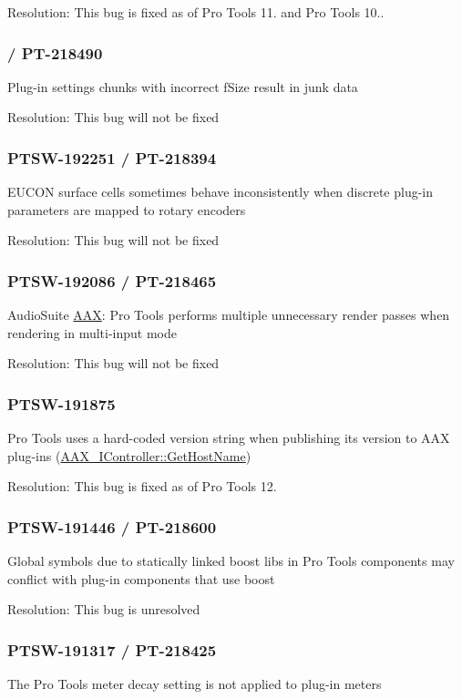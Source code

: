 Resolution\+: This bug is fixed as of Pro Tools 11. and Pro Tools 10..\hypertarget{a00374_PTSW-192456}{}\subsubsection{/ P\+T-\/218490}\label{a00374_PTSW-192456}
Plug-\/in settings chunks with incorrect f\+Size result in junk data

Resolution\+: This bug will not be fixed\hypertarget{a00374_PTSW-192251}{}\subsubsection{P\+T\+S\+W-\/192251 / P\+T-\/218394}\label{a00374_PTSW-192251}
E\+U\+C\+O\+N surface cells sometimes behave inconsistently when discrete plug-\/in parameters are mapped to rotary encoders

Resolution\+: This bug will not be fixed\hypertarget{a00374_PTSW-192086}{}\subsubsection{P\+T\+S\+W-\/192086 / P\+T-\/218465}\label{a00374_PTSW-192086}
Audio\+Suite \hyperlink{a00288}{A\+A\+X}\+: Pro Tools performs multiple unnecessary render passes when rendering in multi-\/input mode

Resolution\+: This bug will not be fixed\hypertarget{a00374_PTSW-191875}{}\subsubsection{P\+T\+S\+W-\/191875}\label{a00374_PTSW-191875}
Pro Tools uses a hard-\/coded version string when publishing its version to A\+A\+X plug-\/ins (\hyperlink{a00090_ad2a002a133491b2ed572054588641e78}{A\+A\+X\+\_\+\+I\+Controller\+::\+Get\+Host\+Name})

Resolution\+: This bug is fixed as of Pro Tools 12.\hypertarget{a00374_PTSW-191446}{}\subsubsection{P\+T\+S\+W-\/191446 / P\+T-\/218600}\label{a00374_PTSW-191446}
Global symbols due to statically linked boost libs in Pro Tools components may conflict with plug-\/in components that use boost

Resolution\+: This bug is unresolved\hypertarget{a00374_PTSW-191317}{}\subsubsection{P\+T\+S\+W-\/191317 / P\+T-\/218425}\label{a00374_PTSW-191317}
The Pro Tools meter decay setting is not applied to plug-\/in meters


